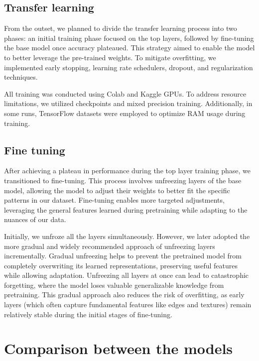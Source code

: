 \documentclass[11pt]{article}
\begin{document}
\subsection{Transfer learning}
From the outset, we planned to divide the transfer learning process into two phases: an initial training phase focused on the top layers, followed by fine-tuning the base model once accuracy plateaued. This strategy aimed to enable the model to better leverage the pre-trained weights. To mitigate overfitting, we implemented early stopping, learning rate schedulers, dropout, and regularization techniques.

All training was conducted using Colab and Kaggle GPUs. To address resource limitations, we utilized checkpoints and mixed precision training. Additionally, in some runs, TensorFlow datasets were employed to optimize RAM usage during training.
\subsection{Fine tuning}
After achieving a plateau in performance during the top layer training phase, we transitioned to fine-tuning. This process involves unfreezing layers of the base model, allowing the model to adjust their weights to better fit the specific patterns in our dataset. Fine-tuning enables more targeted adjustments, leveraging the general features learned during pretraining while adapting to the nuances of our data.

Initially, we unfroze all the layers simultaneously. However, we later adopted the more gradual and widely recommended approach of unfreezing layers incrementally. Gradual unfreezing helps to prevent the pretrained model from completely overwriting its learned representations, preserving useful features while allowing adaptation. Unfreezing all layers at once can lead to catastrophic forgetting, where the model loses valuable generalizable knowledge from pretraining. This gradual approach also reduces the risk of overfitting, as early layers (which often capture fundamental features like edges and textures) remain relatively stable during the initial stages of fine-tuning.
\section{Comparison between the models}
\end{document}
